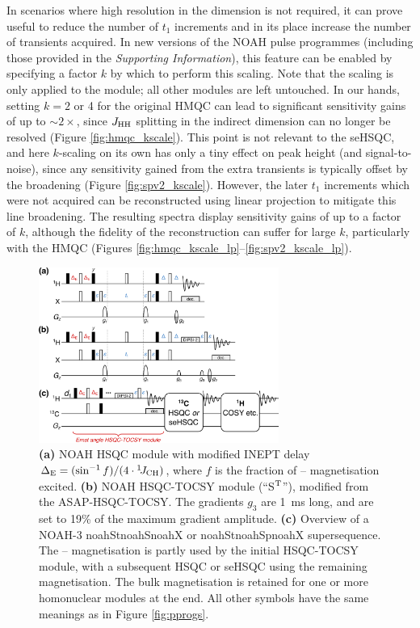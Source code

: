 \documentclass[11pt]{article}
\newcommand*{\noahthree}[3]{\csname noah#1\endcsname\csname noah#2\endcsname\csname noah#3\endcsname}
\newcommand*{\noahSt}{S$\rm ^T$}
\newcommand*{\carbon}{\ce{^{13}C}}
\newcommand*{\proton}{\ce{^{1}H}}
\newcommand*{\nitrogen}{\ce{^{15}N}}
\newcommand*{\onejch}{{}^{1}\!J_{\ce{CH}}}
\newcommand*{\jhh}{J_{\ce{HH}}}
\newcommand*{\figref}[1]{Figure \ref{fig:#1}}
\newcommand*{\SInf}{\textit{Supporting Information}}
\begin{document}
In scenarios where high resolution in the \nitrogen{} dimension is not required, it can prove useful to reduce the number of $t_1$ increments and in its place increase the number of transients acquired.\autocite{Perez-Trujillo2007MRC, Parella2010CMR}
In new versions of the NOAH pulse programmes (including those provided in the \SInf{}), this feature can be enabled by specifying a factor $k$ by which to perform this scaling.
Note that the scaling is only applied to the \nitrogen{} module; all other modules are left untouched.
In our hands, setting $k = 2$ or 4 for the original \nitrogen{} HMQC can lead to significant sensitivity gains of up to $\sim 2\times$, since $\jhh$ splitting in the indirect dimension can no longer be resolved (\figref{hmqc_kscale}).
This point is not relevant to the seHSQC, and here $k$-scaling on its own has only a tiny effect on peak height (and signal-to-noise), since any sensitivity gained from the extra transients is typically offset by the broadening (\figref{spv2_kscale}).
However, the later $t_1$ increments which were not acquired can be reconstructed using linear projection\autocite{linearpred} to mitigate this line broadening.
The resulting spectra display sensitivity gains of up to a factor of $k$, although the fidelity of the reconstruction can suffer for large $k$, particularly with the HMQC (Figures \ref{fig:hmqc_kscale_lp}--\ref{fig:spv2_kscale_lp}).



\begin{figure}
    \centering
    \includegraphics[width=0.7\textwidth]{pprogs_hsqct.png}
    \caption{
        \textbf{(a)} NOAH HSQC module with modified INEPT delay $\Delta_{\mathrm{E}} = (\sin^{-1} f)/(4\cdot\onejch)$, where $f$ is the fraction of \carbon{}--\proton{} magnetisation excited.
        \textbf{(b)} NOAH HSQC-TOCSY module (``\noahSt{}''), modified from the ASAP-HSQC-TOCSY.\autocite{Becker2019JMR}
        The gradients $g_3$ are \SI{1}{\ms} long, and are set to 19\% of the maximum gradient amplitude.
        \textbf{(c)} Overview of a NOAH-3 \noahthree{St}{S}{X} or \noahthree{St}{Sp}{X} supersequence.
        The \carbon{}--\proton{} magnetisation is partly used by the initial HSQC-TOCSY module, with a subsequent HSQC or seHSQC using the remaining magnetisation.
        The bulk magnetisation is retained for one or more homonuclear modules at the end.
        All other symbols have the same meanings as in \figref{pprogs}.
    }
    \label{fig:pprogs_hsqct}
\end{figure}
\end{document}

